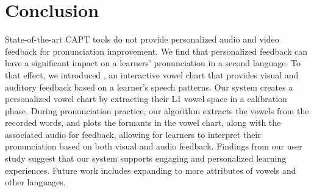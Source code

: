 \section{Conclusion}
State-of-the-art CAPT tools do not provide personalized audio and video feedback for pronunciation improvement. We find that personalized feedback can have a significant impact on a learners' pronunciation in a second language. To that effect, we introduced \visowel{}, an interactive vowel chart that provides visual and auditory feedback based on a learner's speech patterns. 
Our system creates a personalized vowel chart by extracting their L1 vowel space in a calibration phase. During pronunciation practice, our algorithm extracts the vowels from the recorded words, and plots the formants in the vowel chart, along with the associated audio for feedback, allowing for learners to interpret their pronunciation based on both visual and audio feedback. Findings from our user study suggest that our system supports engaging and personalized learning experiences. Future work includes expanding to more attributes of vowels and other languages.
